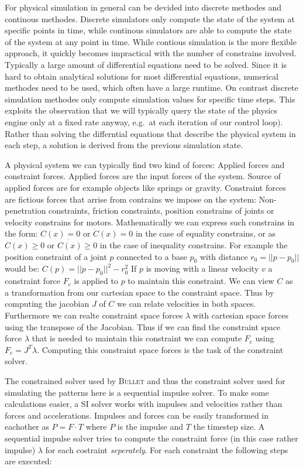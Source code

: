 \documentclass[english,ngerman]{KITreprt}
\newcommand{\name}[1]{\textsc{#1}}
\begin{document}
For physical simulation in general can be devided into discrete methodes
and continous methodes. Discrete simulators only compute the state of
the system at specific points in time, while continous simulators are
able to compute the state of the system at any point in time. While
contious simulation is the more flexible approach, it quickly becomes
impractical with the number of constrains involved. Typically a large
amount of differential equations need to be solved. Since it is hard to
obtain analytical solutions for most differential equations, numerical
methodes need to be used, which often have a large runtime. On contrast
discrete simulation methodes only compute simulation values for specific
time steps. This exploits the observation that we will typically query
the state of the physics engine only at a fixed rate anyway, e.g.~at
each iteration of our control loop). Rather than solving the differntial
equations that describe the physical system in each step, a solution is
derived from the previous simulation state.

A physical system we can typically find two kind of forces: Applied
forces and constraint forces. Applied forces are the input forces of the
system. Source of applied forces are for example objects like springs or
gravity. Constraint forces are fictious forces that arrise from
contrains we impose on the system: Non-penetration constraints, friction
constraints, position constrains of joints or velocity constrains for
motors. Mathematically we can express such constrains in the form:
$C(x) = 0$ or $\dot{C}(x) = 0$ in the case of equality constrains, or as
$C(x) \geq 0$ or $\dot{C(x)} \geq 0$ in the case of inequality
constrains. For example the position constraint of a joint $p$ connected
to a base $p_0$ with distance $r_0 = ||p-p_0||$ would be:
$C(p) = || p - p_0 ||^2 - r_0^2$ If $p$ is moving with a linear velocity
$v$ a constraint force $F_c$ is applied to $p$ to maintain this
constraint. We can view $C$ as a transformation from our cartesian space
to the constraint space. Thus by computing the jacobian $J$ of $C$ we
can relate velocities in both spaces. Furthermore we can realte
constraint space forces $\lambda$ with cartesian space forces using the
transpose of the Jacobian. Thus if we can find the constraint space
force $\lambda$ that is needed to maintain this constraint we can
compute $F_c$ using $F_c = J^T \lambda$. Computing this constraint space
forces is the task of the constraint solver.

The constrained solver used by \name{Bullet} and thus the constraint
solver used for simulating the patterns here is a sequential impulse
solver. To make some calculations easier, a SI solver works with
impulses and velocities rather than forces and accelerations. Impulses
and forces can be easily transformed in eachother as $P = F \cdot T$
where $P$ is the impulse and $T$ the timestep size. A sequential impulse
solver tries to compute the constraint force (in this case rather
impulse) $\lambda$ for each costraint \emph{seperately}. For each
constraint the following steps are executed:
\end{document}
